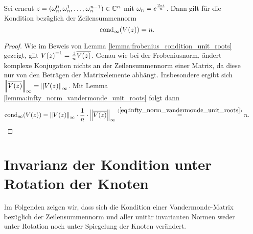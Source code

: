 \begin{lemma}
    Sei erneut $z = (\wn^0, \wn^1, \dots, \wn^{n-1}) \in \Cn$ mit
    $\wn = e^{\frac{2 \pi i}{n}}$.
    Dann gilt für die Kondition bezüglich der Zeilensummennorm
    \[
        \cond[\infty]{\Vand{z}} = n.
    \]
\end{lemma}
\begin{proof}
    Wie im Beweis von Lemma \ref{lemma:frobenius_condition_unit_roots} gezeigt, gilt
    $ \Vand{z}^{-1} = \frac{1}{n} \overline{\Vand{z}} $.
    Genau wie bei der Frobeniusnorm, ändert komplexe Konjugation
    nichts an der Zeilensummennorm einer Matrix, da diese nur von den Beträgen
    der Matrixelemente abhängt. Insbesondere ergibt
    sich $\norm{\overline{\Vand{z}}}_\infty = \norm{\Vand{z}}_\infty$.
    Mit Lemma \ref{lemma:infty_norm_vandermonde_unit_roots} folgt dann
    \[
        \cond[\infty]{\Vand{z}}
        = \norm{\Vand{z}}_\infty \cdot \frac{1}{n} \cdot \norm{\overline{\Vand{z}}}_\infty
        \overset{(\ref{eq:infty_norm_vandermonde_unit_roots})}= n.
    \]
\end{proof}


\section{Invarianz der Kondition unter Rotation der Knoten}

Im Folgenden zeigen wir, dass sich die Kondition einer Vandermonde-Matrix
bezüglich der Zeilensummennorm und aller unitär invarianten Normen weder unter
Rotation noch unter Spiegelung der Knoten verändert.

